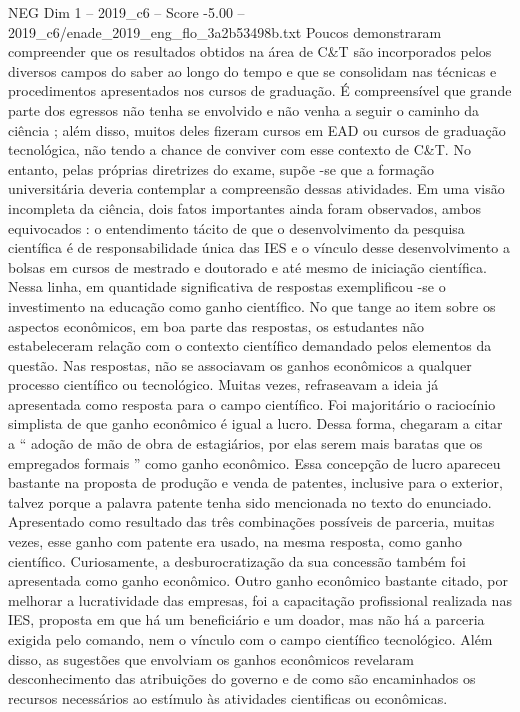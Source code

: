\begin{textsample}{NEG Dim 1 – 2019\_c6 – Score -5.00 – 2019\_c6/enade\_2019\_eng\_flo\_3a2b53498b.txt}
Poucos demonstraram compreender que os resultados obtidos na área de C\&T são incorporados pelos diversos campos do saber ao longo do tempo e que se consolidam nas técnicas e procedimentos apresentados nos cursos de graduação.
É compreensível que grande parte dos egressos não tenha se envolvido e não venha a seguir o caminho da ciência ; além disso, muitos deles fizeram cursos em EAD ou cursos de graduação tecnológica, não tendo a chance de conviver com esse contexto de C\&T.
No entanto, pelas próprias diretrizes do exame, supõe -se que a formação universitária deveria contemplar a compreensão dessas atividades.
Em uma visão incompleta da ciência, dois fatos importantes ainda foram observados, ambos equivocados : o entendimento tácito de que o desenvolvimento da pesquisa científica é de responsabilidade única das IES e o vínculo desse desenvolvimento a bolsas em cursos de mestrado e doutorado e até mesmo de iniciação científica.
Nessa linha, em quantidade significativa de respostas exemplificou -se o investimento na educação como ganho científico.
No que tange ao item sobre os aspectos econômicos, em boa parte das respostas, os estudantes não estabeleceram relação com o contexto científico demandado pelos elementos da questão.
Nas respostas, não se associavam os ganhos econômicos a qualquer processo científico ou tecnológico.
Muitas vezes, refraseavam a ideia já apresentada como resposta para o campo científico.
Foi majoritário o raciocínio simplista de que ganho econômico é igual a lucro.
Dessa forma, chegaram a citar a “ adoção de mão de obra de estagiários, por elas serem mais baratas que os empregados formais ” como ganho econômico.
Essa concepção de lucro apareceu bastante na proposta de produção e venda de patentes, inclusive para o exterior, talvez porque a palavra patente tenha sido mencionada no texto do enunciado.
Apresentado como resultado das três combinações possíveis de parceria, muitas vezes, esse ganho com patente era usado, na mesma resposta, como ganho científico.
Curiosamente, a desburocratização da sua concessão também foi apresentada como ganho econômico.
Outro ganho econômico bastante citado, por melhorar a lucratividade das empresas, foi a capacitação profissional realizada nas IES, proposta em que há um beneficiário e um doador, mas não há a parceria exigida pelo comando, nem o vínculo com o campo científico tecnológico.
Além disso, as sugestões que envolviam os ganhos econômicos revelaram desconhecimento das atribuições do governo e de como são encaminhados os recursos necessários ao estímulo às atividades cientificas ou econômicas.

\end{textsample}
